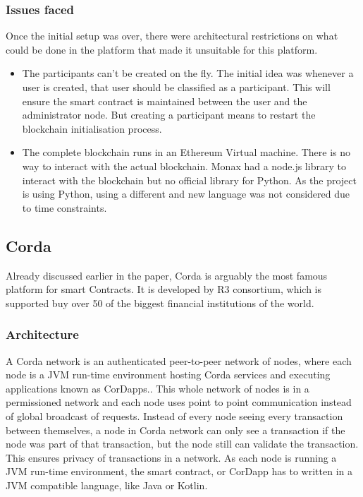 \subsubsection{Issues faced}
Once the initial setup was over, there were architectural restrictions on what could be done in the platform that made it unsuitable for this platform. 
\begin{itemize}
    \item The participants can't be created on the fly. The initial idea was whenever a user is created, that user should be classified as a participant. This will ensure the smart contract is maintained between the user and the administrator node. But creating a participant means to restart the blockchain initialisation process.
    \item The complete blockchain runs in an Ethereum Virtual machine. There is no way to interact with the actual blockchain. Monax had a node.js library to interact with the blockchain but no official library for Python. As the project is using Python, using a different and new language was not considered due to time constraints.
\end{itemize}

\subsection{Corda}
Already discussed earlier in the paper, Corda is arguably the most famous platform for smart Contracts. It is developed by R3 consortium, which is supported buy over 50 of the biggest financial institutions of the world.
\subsubsection{Architecture}
A Corda network is an authenticated peer-to-peer network of nodes, where each node is a JVM run-time environment hosting Corda services and executing applications known as CorDapps.\cite{Hearn2016Corda:Ledger}. This whole network of nodes is in a permissioned network and each node uses point to point communication instead of global broadcast of requests. Instead of every node seeing every transaction between themselves, a node in Corda network can only see a transaction if the node was part of that transaction, but the node still can validate the transaction. This ensures privacy of transactions in a network.
As each node is running a JVM run-time environment, the smart contract, or CorDapp has to written in a JVM compatible language, like Java or Kotlin.


